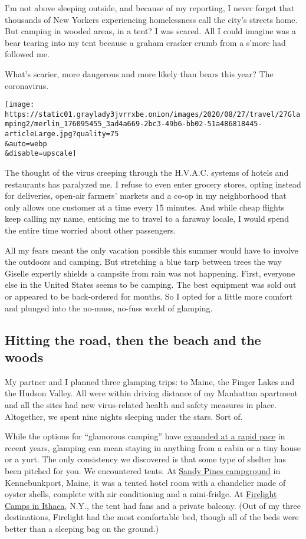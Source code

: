 I'm not above sleeping outside, and because of my reporting, I never
forget that thousands of New Yorkers experiencing homelessness call the
city's streets home. But camping in wooded areas, in a tent? I was
scared. All I could imagine was a bear tearing into my tent because a
graham cracker crumb from a s'more had followed me.

What's scarier, more dangerous and more likely than bears this year? The
coronavirus.

\texttt{[image: https://static01.graylady3jvrrxbe.onion/images/2020/08/27/travel/27Glamping2/merlin\_176095455\_3ad4a669-2bc3-49b6-bb02-51a486818445-articleLarge.jpg?quality=75\\\&auto=webp\\\&disable=upscale]}

The thought of the virus creeping through the H.V.A.C. systems of hotels
and restaurants has paralyzed me. I refuse to even enter grocery stores,
opting instead for deliveries, open-air farmers' markets and a co-op in
my neighborhood that only allows one customer at a time every 15
minutes. And while cheap flights keep calling my name, enticing me to
travel to a faraway locale, I would spend the entire time worried about
other passengers.

All my fears meant the only vacation possible this summer would have to
involve the outdoors and camping. But stretching a blue tarp between
trees the way Giselle expertly shields a campsite from rain was not
happening. First, everyone else in the United States seems to be
camping. The best equipment was sold out or appeared to be back-ordered
for months. So I opted for a little more comfort and plunged into the
no-muss, no-fuss world of glamping.

\hypertarget{hitting-the-road-then-the-beach-and-the-woods}{%
\subsection{Hitting the road, then the beach and the
woods}\label{hitting-the-road-then-the-beach-and-the-woods}}

My partner and I planned three glamping trips: to Maine, the Finger
Lakes and the Hudson Valley. All were within driving distance of my
Manhattan apartment and all the sites had new virus-related health and
safety measures in place. Altogether, we spent nine nights sleeping
under the stars. Sort of.

While the options for ``glamorous camping'' have
\href{https://www.nytimes3xbfgragh.onion/2018/06/15/travel/luxury-camping.html}{expanded
at a rapid pace} in recent years, glamping can mean staying in anything
from a cabin or a tiny house or a yurt. The only consistency we
discovered is that some type of shelter has been pitched for you. We
encountered tents. At
\href{https://sandypinescamping.com/glamping-at-sandy-pines-campground-in-maine/\#tents}{Sandy
Pines campground} in Kennebunkport, Maine, it was a tented hotel room
with a chandelier made of oyster shells, complete with air conditioning
and a mini-fridge. At \href{https://firelightcamps.com/}{Firelight Camps
in Ithaca}, N.Y., the tent had fans and a private balcony. (Out of my
three destinations, Firelight had the most comfortable bed, though all
of the beds were better than a sleeping bag on the ground.)

